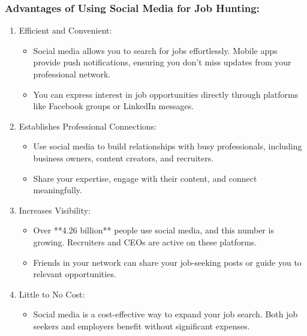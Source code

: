 \subsubsection*{Advantages of Using Social Media for Job Hunting:}
\begin{enumerate}[leftmargin=1cm]
\item Efficient and Convenient:
\begin{itemize}[leftmargin=1cm]
   \item Social media allows you to search for jobs effortlessly. Mobile apps provide push notifications, ensuring you don't miss updates from your professional network.
   \item You can express interest in job opportunities directly through platforms like Facebook groups or LinkedIn messages.
   \end{itemize}
\item Establishes Professional Connections:
\begin{itemize}[leftmargin=1cm]
   \item Use social media to build relationships with busy professionals, including business owners, content creators, and recruiters.
   \item Share your expertise, engage with their content, and connect meaningfully.
   \end{itemize}
\item Increases Visibility:
\begin{itemize}[leftmargin=1cm]
   \item Over **4.26 billion** people use social media, and this number is growing. Recruiters and CEOs are active on these platforms.
   \item Friends in your network can share your job-seeking posts or guide you to relevant opportunities.
   \end{itemize}
\item Little to No Cost:
\begin{itemize}[leftmargin=1cm]
   \item Social media is a cost-effective way to expand your job search. Both job seekers and employers benefit without significant expenses.
   \end{itemize}
   \end{enumerate}
